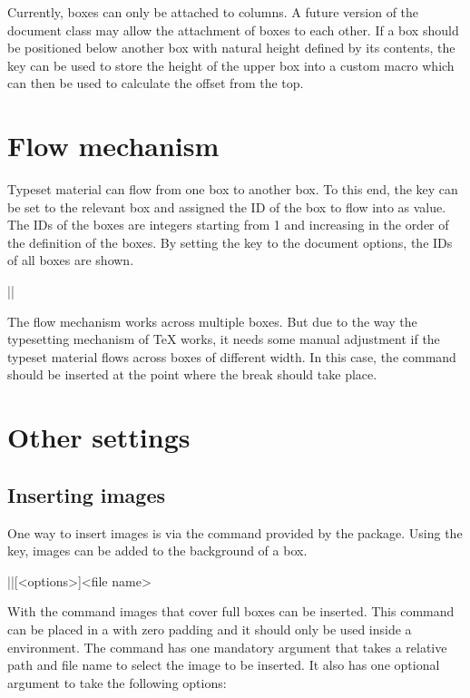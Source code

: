 \documentclass[a4paper]{article}
\begin{document}
Currently, boxes can only be attached to columns. A future version of the document class may allow the attachment of boxes to each other. If a box should be positioned below another box with natural height defined by its contents, the  key can be used to store the height of the upper box into a custom macro which can then be used to calculate the offset from the top.

\section{Flow mechanism}\label{sec:flow}

Typeset material can flow from one box to another box. To this end, the key  can be set to the relevant box and assigned the ID of the box to flow into as value. The IDs of the boxes are integers starting from 1 and increasing in the order of the definition of the boxes. By setting the key  to the document options, the IDs of all boxes are shown.

\begin{macrodef}
|\leporelloboxbreak|
\end{macrodef}
The flow mechanism works across multiple boxes. But due to the way the typesetting mechanism of TeX works, it needs some manual adjustment if the typeset material flows across boxes of different width. In this case, the command \macro{\leporelloboxbreak} should be inserted at the point where the break should take place.

\section{Other settings}

\subsection{Inserting images}

One way to insert images is via the  command provided by the  package. Using the  key, images can be added to the background of a box.

\begin{macrodef}
|\leporelloimage|[<options>]{<file name>}
\end{macrodef}
With the command \macro{\leporelloimage} images that cover full boxes can be inserted. This command can be placed in a  with zero padding and it should only be used inside a  environment. The command has one mandatory argument that takes a relative path and file name to select the image to be inserted. It also has one optional argument to take the following options:
\end{document}
